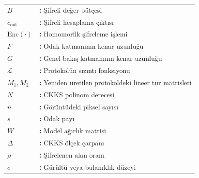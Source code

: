 \hspace{-3mm}
\begin{tabular}{p{2.5cm}l}
$B$ & {\bf:} Şifreli değer bütçesi\\
$c_{\mathrm{out}}$ & {\bf:} Şifreli hesaplama çıktısı\\
$\mathrm{Enc}(\cdot)$ & {\bf:} Homomorfik şifreleme işlemi\\
$F$ & {\bf:} Odak katmanının kenar uzunluğu\\
$G$ & {\bf:} Genel bakış katmanının kenar uzunluğu\\
$\mathcal{L}$ & {\bf:} Protokolün sızıntı fonksiyonu\\
$M_1, M_2$ & {\bf:} Yeniden üretilen protokoldeki lineer tur matrisleri\\
$N$ & {\bf:} CKKS polinom derecesi\\
$n$ & {\bf:} Görüntüdeki piksel sayısı\\
$s$ & {\bf:} Odak payı\\
$W$ & {\bf:} Model ağırlık matrisi\\
$\Delta$ & {\bf:} CKKS ölçek çarpanı\\
$\rho$ & {\bf:} Şifrelenen alan oranı\\
$\sigma$ & {\bf:} Gürültü veya bulanıklık düzeyi\\
\end{tabular}

